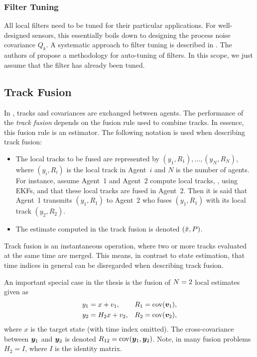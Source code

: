 \subsubsection{Filter Tuning}

All local filters need to be tuned for their particular applications. For well-designed sensors, this essentially boils down to designing the process noise covariance $Q_k$. A systematic approach to filter tuning is described in \cite{Bar-Shalom2001}. The authors of \cite{Chen2018Fusion} propose a methodology for auto-tuning of filters. In this scope, we just assume that the filter has already been tuned. 




\subsection{Track Fusion}

In \abbrDTT, tracks and covariances are exchanged between agents. The performance of the \emph{track fusion} depends on the fusion rule used to combine tracks. In essence, this fusion rule is an estimator. The following notation is used when describing track fusion:
\begin{itemize}
	\item The local tracks to be fused are represented by $(y_1,R_1),\dots,(y_N,R_N)$, where $(y_i,R_i)$ is the local track in Agent~$i$ and $N$ is the number of agents. For instance, assume Agent~1 and Agent~2 compute local tracks, \eg, using EKFs, and that these local tracks are fused in Agent~2. Then it is said that Agent~1 transmits $(y_1,R_1)$ to Agent~2 who fuses $(y_1,R_1)$ with its local track $(y_2,R_2)$.
	\item The estimate computed in the track fusion is denoted $(\hat{x},P)$.
\end{itemize}
Track fusion is an instantaneous operation, where two or more tracks evaluated at the same time are merged. This means, in contrast to state estimation, that time indices in general can be disregarded when describing track fusion. %

An important special case in the thesis is the fusion of $N=2$ local estimates given as
\begin{subequations} \label{eq:model:two-estimates}
\begin{align}
	y_1 &= x + v_1, & R_1=\operatorname*{\rm cov}(\bm{v}_1), \\
	y_2 &= H_2x + v_2, & R_2=\operatorname*{\rm cov}(\bm{v}_2),
\end{align}	
\end{subequations}
where $x$ is the target state (with time index omitted). The cross-covariance between $\bm{y}_1$ and $\bm{y}_2$ is denoted $R_{12}=\operatorname*{\rm cov}(\bm{y}_1,\bm{y}_2)$. Note, in many fusion problems $H_2=I$, where $I$ is the identity matrix.


